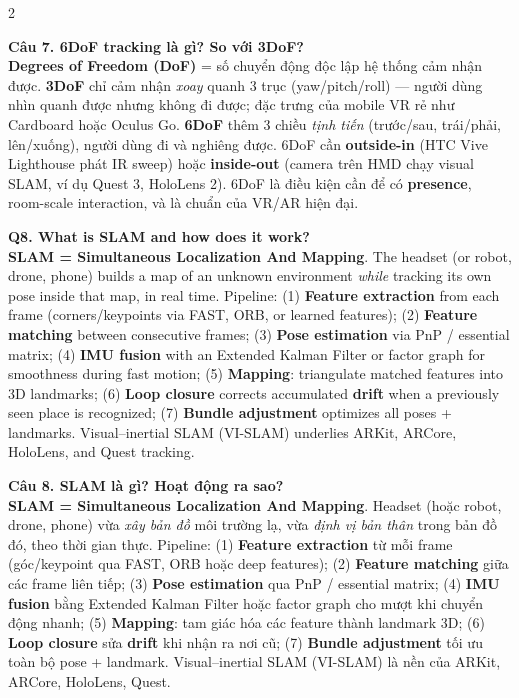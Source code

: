 \begin{paracol}{2}
\switchcolumn

\textbf{Câu 7. 6DoF tracking là gì? So với 3DoF?}\\
\textbf{Degrees of Freedom (DoF)} = số chuyển động độc lập hệ thống cảm nhận được. \textbf{3DoF} chỉ cảm nhận \textit{xoay} quanh 3 trục (yaw/pitch/roll) --- người dùng nhìn quanh được nhưng không đi được; đặc trưng của mobile VR rẻ như Cardboard hoặc Oculus Go. \textbf{6DoF} thêm 3 chiều \textit{tịnh tiến} (trước/sau, trái/phải, lên/xuống), người dùng đi và nghiêng được. 6DoF cần \textbf{outside-in} (HTC Vive Lighthouse phát IR sweep) hoặc \textbf{inside-out} (camera trên HMD chạy visual SLAM, ví dụ Quest 3, HoloLens 2). 6DoF là điều kiện cần để có \textbf{presence}, room-scale interaction, và là chuẩn của VR/AR hiện đại.

\switchcolumn*

\textbf{Q8. What is SLAM and how does it work?}\\
\textbf{SLAM = Simultaneous Localization And Mapping}. The headset (or robot, drone, phone) builds a map of an unknown environment \textit{while} tracking its own pose inside that map, in real time. Pipeline: (1) \textbf{Feature extraction} from each frame (corners/keypoints via FAST, ORB, or learned features); (2) \textbf{Feature matching} between consecutive frames; (3) \textbf{Pose estimation} via PnP / essential matrix; (4) \textbf{IMU fusion} with an Extended Kalman Filter or factor graph for smoothness during fast motion; (5) \textbf{Mapping}: triangulate matched features into 3D landmarks; (6) \textbf{Loop closure} corrects accumulated \textbf{drift} when a previously seen place is recognized; (7) \textbf{Bundle adjustment} optimizes all poses + landmarks. Visual--inertial SLAM (VI-SLAM) underlies ARKit, ARCore, HoloLens, and Quest tracking.

\switchcolumn

\textbf{Câu 8. SLAM là gì? Hoạt động ra sao?}\\
\textbf{SLAM = Simultaneous Localization And Mapping}. Headset (hoặc robot, drone, phone) vừa \textit{xây bản đồ} môi trường lạ, vừa \textit{định vị bản thân} trong bản đồ đó, theo thời gian thực. Pipeline: (1) \textbf{Feature extraction} từ mỗi frame (góc/keypoint qua FAST, ORB hoặc deep features); (2) \textbf{Feature matching} giữa các frame liên tiếp; (3) \textbf{Pose estimation} qua PnP / essential matrix; (4) \textbf{IMU fusion} bằng Extended Kalman Filter hoặc factor graph cho mượt khi chuyển động nhanh; (5) \textbf{Mapping}: tam giác hóa các feature thành landmark 3D; (6) \textbf{Loop closure} sửa \textbf{drift} khi nhận ra nơi cũ; (7) \textbf{Bundle adjustment} tối ưu toàn bộ pose + landmark. Visual--inertial SLAM (VI-SLAM) là nền của ARKit, ARCore, HoloLens, Quest.


\end{paracol}
